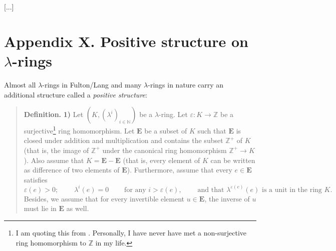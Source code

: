 \documentclass[numbers=enddot,12pt,final,onecolumn,notitlepage]{scrartcl}%
\begin{document}
[...]

\section*{Appendix X. Positive structure on $\lambda$-rings}


Almost all $\lambda$-rings in Fulton/Lang \cite{FulLan85} and many $\lambda
$-rings in nature carry an additional structure called a \textit{positive
structure}:

\begin{quote}
\textbf{Definition.} \textbf{1)} Let $\left(  K,\left(  \lambda^{i}\right)
_{i\in\mathbb{N}}\right)  $ be a $\lambda$-ring. Let $\varepsilon
:K\rightarrow\mathbb{Z}$ be a surjective\footnote{I am quoting this from
\cite{FulLan85}. Personally, I have never have met a non-surjective ring
homomorphism to $\mathbb{Z}$ in my life.} ring homomorphism. Let $\mathbf{E}$
be a subset of $K$ such that $\mathbf{E}$ is closed under addition and
multiplication and contains the subset $\mathbb{Z}^{+}$ of $K$ (that is, the
image of $\mathbb{Z}^{+}$ under the canonical ring homomorphism $\mathbb{Z}%
^{+}\rightarrow K$). Also assume that $K=\mathbf{E}-\mathbf{E}$ (that is,
every element of $K$ can be written as difference of two elements of
$\mathbf{E}$). Furthermore, assume that every $e\in\mathbf{E}$ satisfies%
\[
\varepsilon\left(  e\right)  >0;\ \ \ \ \ \ \ \ \ \ \lambda^{i}\left(
e\right)  =0\ \ \ \ \ \ \ \ \ \ \text{for any }i>\varepsilon\left(  e\right)
,\ \ \ \ \ \ \ \ \ \ \text{and that }\lambda^{\varepsilon\left(  e\right)
}\left(  e\right)  \text{ is a unit in the ring }K.
\]
Besides, we assume that for every invertible element $u\in\mathbf{E}$, the
inverse of $u$ must lie in $\mathbf{E}$ as well.


\end{quote}
\end{document}
